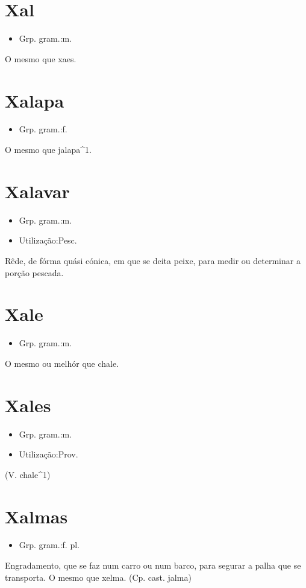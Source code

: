 \section{Xal}
\begin{itemize}
\item {Grp. gram.:m.}
\end{itemize}
O mesmo que \textunderscore xaes\textunderscore .
\section{Xalapa}
\begin{itemize}
\item {Grp. gram.:f.}
\end{itemize}
O mesmo que \textunderscore jalapa\textunderscore ^1.
\section{Xalavar}
\begin{itemize}
\item {Grp. gram.:m.}
\end{itemize}
\begin{itemize}
\item {Utilização:Pesc.}
\end{itemize}
Rêde, de fórma quási cónica, em que se deita peixe, para medir ou determinar a porção pescada.
\section{Xale}
\begin{itemize}
\item {Grp. gram.:m.}
\end{itemize}
O mesmo ou melhór que \textunderscore chale\textunderscore .
\section{Xales}
\begin{itemize}
\item {Grp. gram.:m.}
\end{itemize}
\begin{itemize}
\item {Utilização:Prov.}
\end{itemize}
(V. \textunderscore chale\textunderscore ^1)
\section{Xalmas}
\begin{itemize}
\item {Grp. gram.:f. pl.}
\end{itemize}
Engradamento, que se faz num carro ou num barco, para segurar a palha que se transporta.
O mesmo que \textunderscore xelma\textunderscore .
(Cp. cast. \textunderscore jalma\textunderscore )
